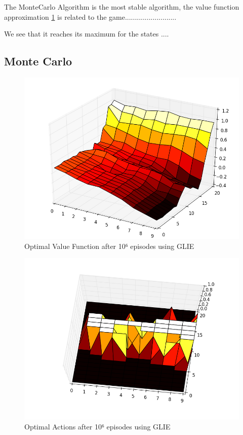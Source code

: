 \documentclass[12pt,a4paper]{article}
\begin{document}
The MonteCarlo Algorithm is the most stable algorithm, the value function approximation \ref{E21_MC_V} is related to the game.......................... 

We see that it reaches its maximum for the states ....

\subsection{Monte Carlo}

\begin{figure}[!ht]
   \caption{\label{E21_MC_V} Optimal Value Function after 10⁶ episodes using GLIE}
   \includegraphics[scale=0.5]{Easy21_Results/MC_value_1e6.png}
\end{figure}

\begin{figure}[!ht]
   \caption{\label{E21_MC_D} Optimal Actions after 10⁶ episodes using GLIE}
   \includegraphics[scale=0.5]{Easy21_Results/MC_decision_1e6.png}
\end{figure}
\end{document}
